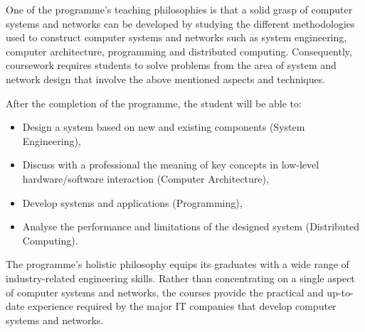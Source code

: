 
One of the programme's teaching philosophies is that a solid grasp of
computer systems and networks can be developed by studying the
different methodologies used to construct computer systems and
networks such as system engineering, computer architecture,
programming and distributed computing. Consequently, course\-work
requires students to solve problems from the area of system and
network design that involve the above mentioned aspects and techniques.

After the completion of the programme, the student will be able to:
\begin{itemize}
\item Design a system based on new and existing components (System
  Engineering),
\item Discuss with a professional the meaning of key concepts in
  low-level hardware/software interaction (Computer Architecture),
\item Develop systems and applications (Programming),
\item Analyse the performance and limitations of the designed system
  (Distributed Computing).
\end{itemize}

The programme's holistic philosophy equips its graduates with a wide
range of industry-related engineering skills. Rather than
concentrating on a single aspect of computer systems and networks, the
courses provide the practical and up-to-date experience required by
the major IT companies that develop computer systems and networks.
